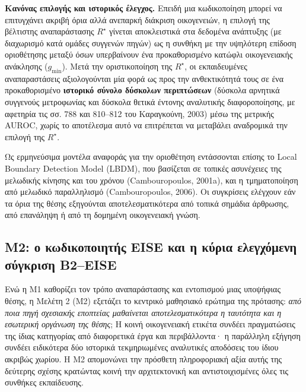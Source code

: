 \documentclass[11pt,a4paper]{article}
\begin{document}
\textbf{Κανόνας επιλογής και ιστορικός έλεγχος.} Επειδή μια κωδικοποίηση μπορεί να επιτυγχάνει ακριβή όρια αλλά ανεπαρκή διάκριση οικογενειών, η επιλογή της βέλτιστης αναπαράστασης \(R^\star\) γίνεται αποκλειστικά στα δεδομένα ανάπτυξης (με διαχωρισμό κατά ομάδες συγγενών πηγών) ως η συνθήκη με την υψηλότερη επίδοση οριοθέτησης μεταξύ όσων υπερβαίνουν ένα προκαθορισμένο κατώφλι οικογενειακής ανάκλησης (\(g_{\min}\)). Μετά την οριστικοποίηση της \(R^\star\), οι εκπαιδευμένες αναπαραστάσεις αξιολογούνται μία φορά ως προς την ανθεκτικότητά τους σε ένα προκαθορισμένο \textbf{ιστορικό σύνολο δύσκολων περιπτώσεων} (δύσκολα αρνητικά συγγενούς μετροφωνίας και δύσκολα θετικά έντονης αναλυτικής διαφοροποίησης, με αφετηρία τις σσ. 788 και 810--812 του Καραγκούνη, 2003) μέσω της μετρικής AUROC, χωρίς το αποτέλεσμα αυτό να επιτρέπεται να μεταβάλει αναδρομικά την επιλογή της \(R^\star\).

Ως ερμηνεύσιμα μοντέλα αναφοράς για την οριοθέτηση εντάσσονται επίσης το Local Boundary Detection Model (LBDM), που βασίζεται σε τοπικές ασυνέχειες της μελωδικής κίνησης και του χρόνου (Cambouropoulos, 2001a), και η τμηματοποίηση από μελωδικό παραλληλισμό (Cambouropoulos, 2006). Οι συγκρίσεις ελέγχουν εάν τα όρια της θέσης εξηγούνται αποτελεσματικότερα από τοπικά σημάδια άρθρωσης, από επανάληψη ή από τη δομημένη οικογενειακή γνώση.

\subsection{Μ2: ο κωδικοποιητής EISE και η κύρια ελεγχόμενη σύγκριση B2--EISE}\label{ux3bc2-ux3bf-ux3baux3c9ux3b4ux3b9ux3baux3bfux3c0ux3bfux3b9ux3b7ux3c4ux3aeux3c2-eise-ux3baux3b1ux3b9-ux3b7-ux3baux3cdux3c1ux3b9ux3b1-ux3b5ux3bbux3b5ux3b3ux3c7ux3ccux3bcux3b5ux3bdux3b7-ux3c3ux3cdux3b3ux3baux3c1ux3b9ux3c3ux3b7-b2eise}

Ενώ η Μ1 καθορίζει τον τρόπο αναπαράστασης και εντοπισμού μιας υποψήφιας θέσης, η Μελέτη 2 (Μ2) εξετάζει το κεντρικό μαθησιακό ερώτημα της πρότασης: \emph{από ποια πηγή σχεσιακής εποπτείας μαθαίνεται αποτελεσματικότερα η ταυτότητα και η εσωτερική οργάνωση της θέσης}; Η κοινή οικογενειακή ετικέτα συνδέει πραγματώσεις της ίδιας κατηγορίας από διαφορετικά έργα και περιβάλλοντα· η παράλληλη εξήγηση συνδέει ειδικότερα δύο ιστορικά τεκμηριωμένες αναλυτικές αποδόσεις του ίδιου ακριβώς χωρίου. Η Μ2 απομονώνει την πρόσθετη πληροφοριακή αξία αυτής της δεύτερης σχέσης κρατώντας κοινή την αρχιτεκτονική και αντιστοιχισμένες όλες τις συνθήκες εκπαίδευσης.
\end{document}
